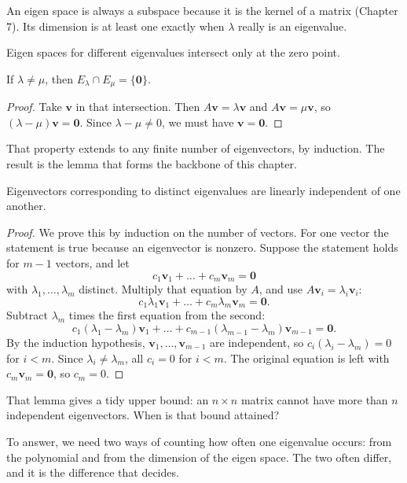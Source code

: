 An eigen space is always a subspace because it is the kernel of a matrix (Chapter 7). Its
dimension is at least one exactly when $\lambda$ really is an eigenvalue.

Eigen spaces for different eigenvalues intersect only at the zero point.

\begin{proposisi}
If $\lambda\neq\mu$, then $E_{\lambda}\cap E_{\mu}=\{\mathbf{0}\}$.
\end{proposisi}

\begin{proof}
Take $\mathbf{v}$ in that intersection. Then $A\mathbf{v}=\lambda\mathbf{v}$ and
$A\mathbf{v}=\mu\mathbf{v}$, so $(\lambda-\mu)\mathbf{v}=\mathbf{0}$. Since
$\lambda-\mu\neq0$, we must have $\mathbf{v}=\mathbf{0}$.
\end{proof}

That property extends to any finite number of eigenvectors, by induction. The result is the lemma
that forms the backbone of this chapter.

\begin{lemma}
Eigenvectors corresponding to distinct eigenvalues are linearly independent of one another.
\end{lemma}

\begin{proof}
We prove this by induction on the number of vectors. For one vector the statement is true because
an eigenvector is nonzero. Suppose the statement holds for $m-1$ vectors, and let
\[
  c_{1}\mathbf{v}_{1}+\dots+c_{m}\mathbf{v}_{m}=\mathbf{0}
\]
with $\lambda_{1},\dots,\lambda_{m}$ distinct. Multiply that equation by $A$, and use
$A\mathbf{v}_{i}=\lambda_{i}\mathbf{v}_{i}$:
\[
  c_{1}\lambda_{1}\mathbf{v}_{1}+\dots+c_{m}\lambda_{m}\mathbf{v}_{m}=\mathbf{0}.
\]
Subtract $\lambda_{m}$ times the first equation from the second:
\[
  c_{1}(\lambda_{1}-\lambda_{m})\mathbf{v}_{1}+\dots
  +c_{m-1}(\lambda_{m-1}-\lambda_{m})\mathbf{v}_{m-1}=\mathbf{0}.
\]
By the induction hypothesis, $\mathbf{v}_{1},\dots,\mathbf{v}_{m-1}$ are independent, so
$c_{i}(\lambda_{i}-\lambda_{m})=0$ for $i<m$. Since $\lambda_{i}\neq\lambda_{m}$, all $c_{i}=0$
for $i<m$. The original equation is left with $c_{m}\mathbf{v}_{m}=\mathbf{0}$, so $c_{m}=0$.
\end{proof}

That lemma gives a tidy upper bound: an $n\times n$ matrix cannot have more than $n$ independent
eigenvectors. When is that bound attained?

To answer, we need two ways of counting how often one eigenvalue occurs: from the polynomial and
from the dimension of the eigen space. The two often differ, and it is the difference that decides.

